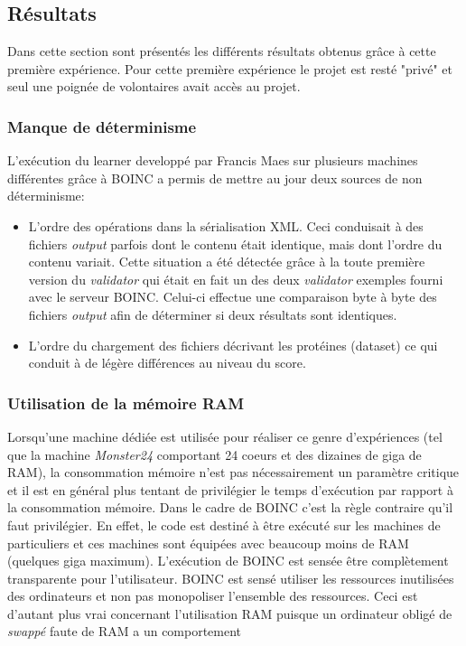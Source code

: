 \documentclass[a4paper, 11pt]{report}
\begin{document}
\subsection{Résultats}
Dans cette section sont présentés les différents résultats obtenus grâce à cette première expérience. %
Pour cette première expérience le projet est resté "privé" et seul une poignée de volontaires avait accès au projet.

\subsubsection{Manque de déterminisme}
L'exécution du learner developpé par Francis Maes sur plusieurs machines différentes grâce à \textsc{BOINC} a permis de mettre au jour deux sources de non déterminisme:
\begin{itemize}
\item L'ordre des opérations dans la sérialisation XML. Ceci conduisait à des fichiers \textit{output} parfois dont le contenu était identique, mais dont l'ordre du contenu variait. Cette situation a été détectée grâce à la toute première version du \textit{validator} qui était en fait un des deux \textit{validator} exemples fourni avec le serveur \textsc{BOINC}. Celui-ci effectue une comparaison byte à byte des fichiers \textit{output} afin de déterminer si deux résultats sont identiques.
\item L'ordre du chargement des fichiers décrivant les protéines (dataset) ce qui conduit à de légère différences au niveau du score.
\end{itemize}

\subsubsection{Utilisation de la mémoire RAM}
Lorsqu'une machine dédiée est utilisée pour réaliser ce genre d'expériences (tel que la machine \textit{Monster24} comportant 24 coeurs et des dizaines de giga de RAM), la consommation mémoire n'est pas nécessairement un paramètre critique et il est en général plus tentant de privilégier le temps d'exécution par rapport à la consommation mémoire. Dans le cadre de \textsc{BOINC} c'est la règle contraire qu'il faut privilégier. En effet, le code est destiné à être exécuté sur les machines de particuliers et ces machines sont équipées avec beaucoup moins de RAM (quelques giga maximum). L'exécution de \textsc{BOINC} est sensée être complètement transparente pour l'utilisateur. \textsc{BOINC} est sensé utiliser les ressources inutilisées des ordinateurs et non pas monopoliser l'ensemble des ressources. Ceci est d'autant plus vrai concernant l'utilisation RAM puisque un ordinateur obligé de \textit{swappé} faute de RAM a un comportement %
\end{document}
